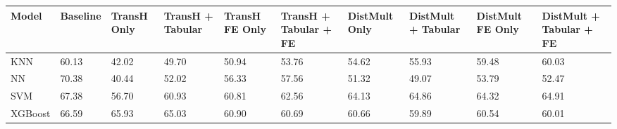 \begin{tabular}{llllllllll}
\toprule
Model & Baseline & TransH Only & TransH + Tabular & TransH FE Only & TransH + Tabular + FE & DistMult Only & DistMult + Tabular & DistMult FE Only & DistMult + Tabular + FE \\
\midrule
KNN & 60.13 & 42.02 & 49.70 & 50.94 & 53.76 & 54.62 & 55.93 & 59.48 & 60.03 \\
NN & 70.38 & 40.44 & 52.02 & 56.33 & 57.56 & 51.32 & 49.07 & 53.79 & 52.47 \\
SVM & 67.38 & 56.70 & 60.93 & 60.81 & 62.56 & 64.13 & 64.86 & 64.32 & 64.91 \\
XGBoost & 66.59 & 65.93 & 65.03 & 60.90 & 60.69 & 60.66 & 59.89 & 60.54 & 60.01 \\
\bottomrule
\end{tabular}
